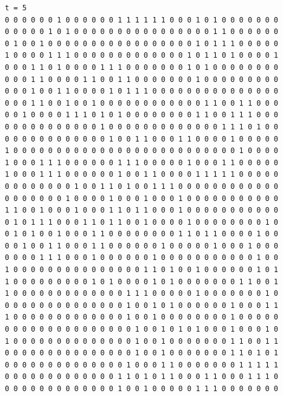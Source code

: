 \documentclass[a4paper,12pt]{article}
\begin{document}
\begin{verbatim}
t = 5
0 0 0 0 0 0 1 0 0 0 0 0 0 1 1 1 1 1 1 0 0 0 1 0 1 0 0 0 0 0 0 0 
0 0 0 0 0 1 0 1 0 0 0 0 0 0 0 0 0 0 0 0 0 0 0 0 1 1 0 0 0 0 0 0 
0 1 0 0 1 0 0 0 0 0 0 0 0 0 0 0 0 0 0 0 0 0 1 0 1 1 1 0 0 0 0 0 
1 0 0 0 0 1 1 1 0 0 0 0 0 0 0 0 0 0 0 0 0 1 0 1 1 0 1 0 0 0 0 1 
0 0 0 1 1 0 1 0 0 0 0 1 1 1 0 0 0 0 0 0 0 1 0 1 0 0 0 0 0 0 0 0 
0 0 0 1 1 0 0 0 0 1 1 0 0 1 1 0 0 0 0 0 0 0 1 0 0 0 0 0 0 0 0 0 
0 0 0 1 0 0 1 1 0 0 0 0 1 0 1 1 1 0 0 0 0 0 0 0 0 0 0 0 0 0 0 0 
0 0 0 1 1 0 0 1 0 0 1 0 0 0 0 0 0 0 0 0 0 0 0 1 1 0 0 1 1 0 0 0 
0 0 1 0 0 0 0 1 1 1 0 1 0 1 0 0 0 0 0 0 0 0 1 1 0 0 1 1 1 0 0 0 
0 0 0 0 0 0 0 0 0 0 0 1 0 0 0 0 0 0 0 0 0 0 0 0 0 1 1 1 0 1 0 0 
0 0 0 0 0 0 0 0 0 0 0 0 1 0 0 1 1 0 0 0 1 1 0 0 0 0 1 0 0 0 0 0 
1 0 0 0 0 0 0 0 0 0 0 0 0 0 0 0 0 0 0 0 0 0 0 0 0 0 0 1 0 0 0 0 
1 0 0 0 1 1 1 0 0 0 0 0 0 1 1 1 0 0 0 0 0 1 0 0 0 1 1 0 0 0 0 0 
1 0 0 0 1 1 1 0 0 0 0 0 0 1 0 0 1 1 0 0 0 0 1 1 1 1 1 0 0 0 0 0 
0 0 0 0 0 0 0 0 1 0 0 1 1 0 1 0 0 1 1 1 0 0 0 0 0 0 0 0 0 0 0 0 
0 0 0 0 0 0 0 1 0 0 0 0 1 0 0 0 1 0 0 0 1 0 0 0 0 0 0 0 0 0 0 0 
1 1 0 0 1 0 0 0 1 0 0 0 1 1 0 1 1 0 0 0 1 0 0 0 0 0 0 0 0 0 0 0 
0 1 0 1 1 1 0 0 0 1 1 0 1 1 0 0 1 0 0 0 0 1 0 0 0 0 0 0 0 0 1 0 
0 1 0 1 0 0 1 0 0 0 1 1 0 0 0 0 0 0 0 0 1 1 0 1 1 0 0 0 0 1 0 0 
0 0 1 0 0 1 1 0 0 0 1 1 0 0 0 0 0 0 1 0 0 0 0 0 1 0 0 0 1 0 0 0 
0 0 0 0 1 1 1 0 0 0 1 0 0 0 0 0 0 1 0 0 0 0 0 0 0 0 0 0 0 1 0 0 
1 0 0 0 0 0 0 0 0 0 0 0 0 0 0 0 1 1 0 1 0 0 1 0 0 0 0 0 0 1 0 1 
1 0 0 0 0 0 0 0 0 0 1 0 1 0 0 0 0 1 0 1 0 0 0 0 0 0 0 1 1 0 0 1 
1 0 0 0 0 0 0 0 0 0 0 0 0 0 1 1 1 0 0 0 0 0 1 0 0 0 0 0 0 0 1 0 
0 0 0 0 0 0 0 0 0 0 0 0 0 0 1 0 0 1 0 1 0 0 0 0 0 0 1 0 0 0 1 1 
1 0 0 0 0 0 0 0 0 0 0 0 0 0 1 0 0 1 0 0 0 0 0 0 0 0 1 0 0 0 0 0 
0 0 0 0 0 0 0 0 0 0 0 0 0 0 0 1 0 0 1 0 1 0 1 0 0 0 1 0 0 0 1 0 
1 0 0 0 0 0 0 0 0 0 0 0 0 0 0 1 0 0 1 0 0 0 0 0 0 0 1 1 0 0 1 1 
0 0 0 0 0 0 0 0 0 0 0 0 0 0 0 1 0 0 1 0 0 0 0 0 0 0 1 1 0 1 0 1 
0 0 0 0 0 0 0 0 0 0 0 0 0 0 1 0 0 0 1 1 0 0 0 0 0 0 0 1 1 1 1 1 
0 0 0 0 0 0 0 0 0 0 0 0 0 1 1 0 1 0 1 1 0 0 0 1 1 0 0 0 1 1 1 0 
0 0 0 0 0 0 0 0 0 0 0 0 0 1 0 0 1 0 0 0 0 0 1 1 1 0 0 0 0 0 0 0 




\end{verbatim}
\end{document}
